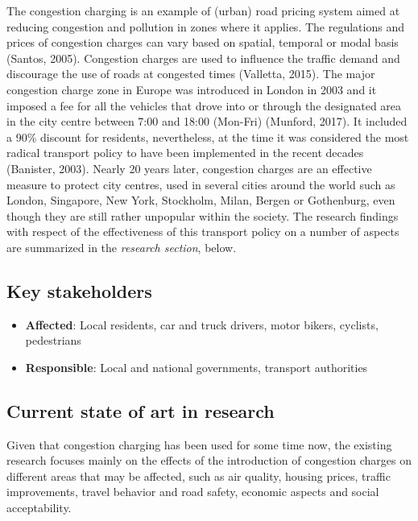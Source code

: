 \documentclass[
]{book}
\providecommand{\tightlist}{%
  \setlength{\itemsep}{0pt}\setlength{\parskip}{0pt}}
\begin{document}
The congestion charging is an example of (urban) road pricing system aimed at reducing congestion and pollution in zones where it applies. The regulations and prices of congestion charges can vary based on spatial, temporal or modal basis (Santos, 2005). Congestion charges are used to influence the traffic demand and discourage the use of roads at congested times (Valletta, 2015). The major congestion charge zone in Europe was introduced in London in 2003 and it imposed a fee for all the vehicles that drove into or through the designated area in the city centre between 7:00 and 18:00 (Mon-Fri) (Munford, 2017). It included a 90\% discount for residents, nevertheless, at the time it was considered the most radical transport policy to have been implemented in the recent decades (Banister, 2003). Nearly 20 years later, congestion charges are an effective measure to protect city centres, used in several cities around the world such as London, Singapore, New York, Stockholm, Milan, Bergen or Gothenburg, even though they are still rather unpopular within the society. The research findings with respect of the effectiveness of this transport policy on a number of aspects are summarized in the \emph{research section}, below.

\hypertarget{key-stakeholders-6}{%
\subsection*{Key stakeholders}\label{key-stakeholders-6}}

\begin{itemize}
\tightlist
\item
  \textbf{Affected}: Local residents, car and truck drivers, motor bikers, cyclists, pedestrians
\item
  \textbf{Responsible}: Local and national governments, transport authorities
\end{itemize}

\hypertarget{current-state-of-art-in-research-6}{%
\subsection*{Current state of art in research}\label{current-state-of-art-in-research-6}}

Given that congestion charging has been used for some time now, the existing research focuses mainly on the effects of the introduction of congestion charges on different areas that may be affected, such as air quality, housing prices, traffic improvements, travel behavior and road safety, economic aspects and social acceptability.
\end{document}
